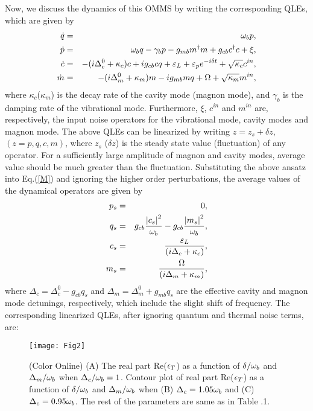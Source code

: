 \documentclass[aps,pra,superscriptaddress,balancelastpage,twocolumn]{revtex4}
\begin{document}
Now, we discuss the dynamics of this OMMS by writing the corresponding QLEs,
which are given by
\begin{eqnarray}
\dot{q} &=&\omega _{b}p,  \notag \\
\dot{p} &=&\omega _{b}q-\gamma _{b}p-g_{mb}m^{\dagger }m+g_{cb}c^{\dagger
}c+\xi , \notag \\
\dot{c} &=&-(i\Delta _{c}^{0}+\kappa _{c})c+ig_{cb}cq+\varepsilon _{L}
+\varepsilon _{p}e^{-i\delta t}+\sqrt{\kappa _{c}}c^{in}, \notag \\
\dot{m} &=&-(i\Delta _{m}^{0}+\kappa _{m})m-ig_{mb}mq+\Omega +\sqrt{\kappa
_{m}}m^{in},  \label{M}
\end{eqnarray}%
where $\kappa _{c}$($\kappa _{m}$) is the decay rate of the cavity mode
(magnon mode), and $\gamma _{b}$ is the damping rate of the vibrational
mode. Furthermore, $\xi $, $c^{in}$ and $m^{in}$ are, respectively, the
input noise operators for the vibrational mode, cavity modes and magnon
mode. The above QLEs can be linearized by writing $z=z_{s}+\delta z$, $%
(z=p,q,c,m)$, where $z_{s}$ ($\delta z$) is the steady state value
(fluctuation) of any operator. For a sufficiently large amplitude of magnon
and cavity modes, average value should be much greater than the fluctuation.
Substituting the above ansatz into Eq.(\ref{M}) and ignoring the
higher order perturbations, the average values of the dynamical operators
are given by
\begin{eqnarray}
p_{s} &=&0, \notag \\
q_{s} &=&g_{cb}\frac{\left\vert c_{s} \right\vert ^{2}%
}{\omega _{b}}-g_{cb}\frac{\left\vert m_{s} \right\vert ^{2}}{\omega _{b}},  \notag \\%
c_{s} &=&\frac{\varepsilon _{L}}{(i\Delta _{c}+\kappa _{c})}, \notag \\
m_{s} &=&\frac{\Omega }{(i\Delta _{m}+\kappa _{m})}, \label{SS}
\end{eqnarray}%
where $\Delta _{c}=\Delta _{c}^{0}-g_{cb}q_{s} $ and $\Delta _{m}=\Delta _{m}^{0}+g_{mb}q_{s} $ are the
effective cavity and magnon mode detunings, respectively, which include the
slight shift of frequency. The corresponding linearized QLEs, after ignoring
quantum and thermal noise terms, are:
\begin{figure*}[tbp]
\begin{center}
\texttt{[image: Fig2]}
\end{center}
\caption{(Color Online) (A) The real part Re($\protect\epsilon _{T}$) as a
function of $\protect\delta /\protect\omega _{b}$ and $\Delta _{m}/\protect%
\omega _{b}$ when $\Delta _{c}/\protect\omega _{b}=1$. Contour plot of real
part Re($\protect\epsilon _{T}$) as a function of $\protect\delta /\protect%
\omega _{b}$ and $\Delta _{m}/\protect\omega _{b}$ when (B) $\Delta _{c}=1.05%
\protect\omega _{b}$ and (C) $\Delta _{c}=0.95\protect\omega _{b}$. The rest
of the parameters are same as in Table .1.}
\end{figure*}
\end{document}
